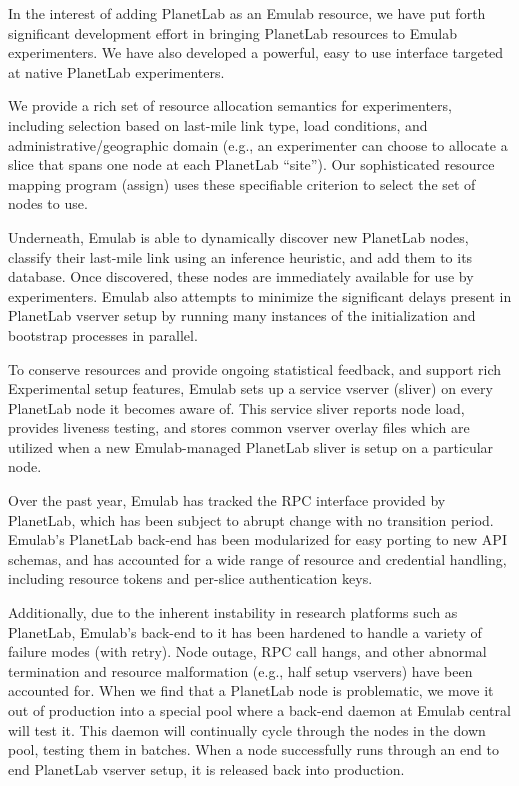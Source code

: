 \item[Integration with and improved interface to PlanetLab.]
%
In the interest of adding PlanetLab as an Emulab resource, we have put forth
significant development effort in bringing PlanetLab resources to Emulab
experimenters.  We have also developed a powerful, easy to use interface
targeted at native PlanetLab experimenters.

We provide a rich set of resource allocation semantics for experimenters,
including selection based on last-mile link type, load conditions, and
administrative/geographic domain (e.g., an experimenter can choose to allocate
a slice that spans one node at each PlanetLab ``site'').  Our sophisticated
resource mapping program (assign) uses these specifiable criterion to select
the set of nodes to use.

Underneath, Emulab is able to dynamically discover new PlanetLab nodes,
classify their last-mile link using an inference heuristic, and add them to its
database.  Once discovered, these nodes are immediately available for use by
experimenters.  Emulab also attempts to minimize the significant delays present
in PlanetLab vserver setup by running many instances of the initialization and
bootstrap processes in parallel.

To conserve resources and provide ongoing statistical feedback, and support
rich Experimental setup features, Emulab sets up a service vserver (sliver) on
every PlanetLab node it becomes aware of.  This service sliver reports node
load, provides liveness testing, and stores common vserver overlay files which
are utilized when a new Emulab-managed PlanetLab sliver is setup on a
particular node.

Over the past year, Emulab has tracked the RPC interface provided by PlanetLab,
which has been subject to abrupt change with no transition period.  Emulab's
PlanetLab back-end has been modularized for easy porting to new API schemas,
and has accounted for a wide range of resource and credential handling,
including resource tokens and per-slice authentication keys.

Additionally, due to the inherent instability in research platforms such as
PlanetLab, Emulab's back-end to it has been hardened to handle a variety of
failure modes (with retry).  Node outage, RPC call hangs, and other abnormal
termination and resource malformation (e.g., half setup vservers) have been
accounted for.  When we find that a PlanetLab node is problematic, we move it
out of production into a special pool where a back-end daemon at Emulab central
will test it.  This daemon will continually cycle through the nodes in the down
pool, testing them in batches.  When a node successfully runs through an end to
end PlanetLab vserver setup, it is released back into production.

